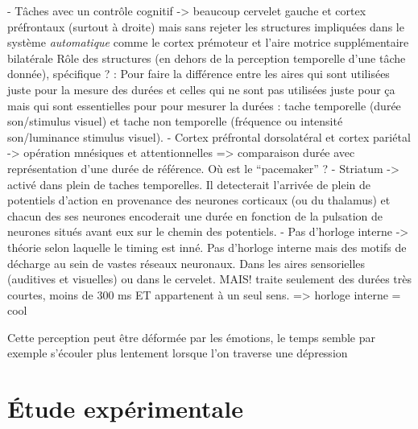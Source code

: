 \documentclass[12pt,fleqn,oneside,openany]{book} %
\begin{document}
		- Tâches avec un contrôle cognitif -> beaucoup cervelet gauche et cortex préfrontaux (surtout à droite) mais sans rejeter les structures impliquées dans le système \emph{automatique} comme le cortex prémoteur et l'aire motrice supplémentaire bilatérale
	Rôle des structures (en dehors de la perception temporelle d'une tâche donnée), spécifique ? : 
		Pour faire la différence entre les aires qui sont utilisées juste pour la mesure des durées et celles qui ne sont pas utilisées juste pour ça mais qui sont essentielles pour pour mesurer la durées : tache temporelle (durée son/stimulus visuel) et tache non temporelle (fréquence ou intensité son/luminance stimulus visuel). 
		- Cortex préfrontal dorsolatéral et cortex pariétal -> opération mnésiques et attentionnelles => comparaison durée avec représentation d'une durée de référence.
	Où est le ``pacemaker'' ?
		- Striatum -> activé dans plein de taches temporelles. Il detecterait l'arrivée de plein de potentiels d'action en provenance des neurones corticaux (ou du thalamus) et chacun des ses neurones encoderait une durée en fonction de la pulsation de neurones situés avant eux sur le chemin des potentiels. 
		- Pas d'horloge interne -> théorie selon laquelle le timing est inné. Pas d'horloge interne mais des motifs de décharge au sein de vastes réseaux neuronaux. Dans les aires sensorielles (auditives et visuelles) ou dans le cervelet. MAIS! traite seulement des durées très courtes, moins de 300 ms ET appartenent à un seul sens. => horloge interne = cool


\begin{figure}[h]
\end{figure}

Cette perception peut être déformée par les émotions, le temps semble par exemple s'écouler plus lentement lorsque l'on traverse une dépression \cite{emotionsTemps,emotionsTemps2}



\chapter{\'Etude expérimentale} \label{cha:etudeExp}
\end{document}
